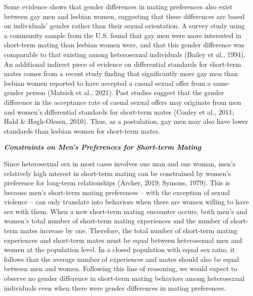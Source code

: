 \documentclass[
  12pt,
]{article}
\begin{document}
Some evidence shows that gender differences in mating preferences also
exist between gay men and lesbian women, suggesting that these
differences are based on individuals' gender rather than their sexual
orientation. A survey study using a community sample from the U.S. found
that gay men were more interested in short-term mating than lesbian
women were, and that this gender difference was comparable to that
existing among heterosexual individuals (Bailey et al., 1994). An
additional indirect piece of evidence on differential standards for
short-term mates comes from a recent study finding that significantly
more gay men than lesbian women reported to have accepted a casual
sexual offer from a same-gender person (Matsick et al., 2021). Past
studies suggest that the gender difference in the acceptance rate of
casual sexual offers may originate from men and women's differential
standards for short-term mates (Conley et al., 2011; Hald \&
Høgh-Olesen, 2010). Thus, as a postulation, gay men may also have lower
standards than lesbian women for short-term mates.

\textbf{\emph{Constraints on Men's Preferences for Short-term Mating}}

Since heterosexual sex in most cases involves one man and one woman,
men's relatively high interest in short-term mating can be constrained
by women's preference for long-term relationships (Archer, 2019; Symons,
1979). This is because men's short-term mating preferences -- with the
exception of sexual violence -- can only translate into behaviors when
there are women willing to have sex with them. When a new short-term
mating encounter occurs, both men's and women's total number of
short-term mating experiences and the number of short-term mates
increase by one. Therefore, the total number of short-term mating
experiences and short-term mates must be equal between heterosexual men
and women at the population level. In a closed population with equal sex
ratio, it follows that the average number of experiences and mates
should also be equal between men and women. Following this line of
reasoning, we would expect to observe no gender difference in short-term
mating behaviors among heterosexual individuals even when there were
gender differences in mating preferences.
\end{document}
